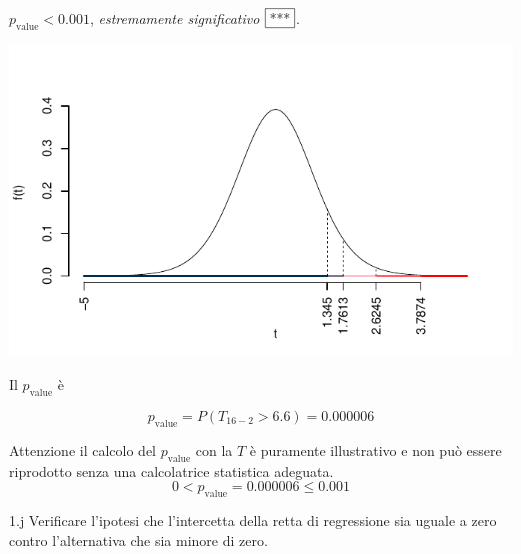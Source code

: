 \documentclass[
  11pt,
]{book}
\theoremstyle{mytheoremstyle}
\theoremstyle{mydefstyle}
\newenvironment{sol}
  {
  \begin{tcolorbox}[enhanced,breakable,arc=0.1mm,boxrule=1pt,colback=white,colframe=iblue,
  title=\bf \fontfamily{lmss}\selectfont \hspace{.5 cm} Soluzione,drop fuzzy shadow]

}{
\end{tcolorbox}
  }
\begin{document}
\begin{sol}
\(p_\text{value}<0.001\), \emph{estremamente significativo} \(\fbox{***}\).

\begin{center}\includegraphics{Esami_passati_con_soluzioni_files/figure-latex/06-regr-7,-1} \end{center}

Il \(p_{\text{value}}\) è

\[ p_{\text{value}} = P(T_{16-2}>6.6)=0.000006 \]

Attenzione il calcolo del \(p_\text{value}\) con la \(T\) è puramente illustrativo e non può essere riprodotto senza una calcolatrice statistica adeguata.\[
 0 < p_\text{value}= 0.000006 \leq 0.001 
\]

\end{sol}

1.j Verificare l'ipotesi che l'intercetta della retta di
regressione sia uguale a zero contro l'alternativa che sia
minore di zero.
\end{document}
